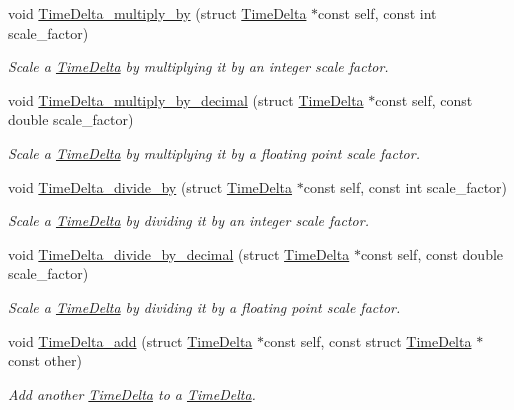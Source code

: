 \begin{DoxyCompactItemize}
void \hyperlink{time-delta_8h_a772db85da3c67f149da8877ac8d04fad}{\-Time\-Delta\-\_\-multiply\-\_\-by} (struct \hyperlink{structTimeDelta}{\-Time\-Delta} $\ast$const self, const int scale\-\_\-factor)
\begin{DoxyCompactList}\small\item\em \-Scale a \hyperlink{structTimeDelta}{\-Time\-Delta} by multiplying it by an integer scale factor. \end{DoxyCompactList}\item 
void \hyperlink{time-delta_8h_a561fba60f8ba4648928fec8e18069ebb}{\-Time\-Delta\-\_\-multiply\-\_\-by\-\_\-decimal} (struct \hyperlink{structTimeDelta}{\-Time\-Delta} $\ast$const self, const double scale\-\_\-factor)
\begin{DoxyCompactList}\small\item\em \-Scale a \hyperlink{structTimeDelta}{\-Time\-Delta} by multiplying it by a floating point scale factor. \end{DoxyCompactList}\item 
void \hyperlink{time-delta_8h_abab39f5630f78511f708765da0be8632}{\-Time\-Delta\-\_\-divide\-\_\-by} (struct \hyperlink{structTimeDelta}{\-Time\-Delta} $\ast$const self, const int scale\-\_\-factor)
\begin{DoxyCompactList}\small\item\em \-Scale a \hyperlink{structTimeDelta}{\-Time\-Delta} by dividing it by an integer scale factor. \end{DoxyCompactList}\item 
void \hyperlink{time-delta_8h_acca21ee20d4addbd3925461259f4f12a}{\-Time\-Delta\-\_\-divide\-\_\-by\-\_\-decimal} (struct \hyperlink{structTimeDelta}{\-Time\-Delta} $\ast$const self, const double scale\-\_\-factor)
\begin{DoxyCompactList}\small\item\em \-Scale a \hyperlink{structTimeDelta}{\-Time\-Delta} by dividing it by a floating point scale factor. \end{DoxyCompactList}\item 
void \hyperlink{time-delta_8h_a388c9982a85d4f02741d4905fc8c3a1b}{\-Time\-Delta\-\_\-add} (struct \hyperlink{structTimeDelta}{\-Time\-Delta} $\ast$const self, const struct \hyperlink{structTimeDelta}{\-Time\-Delta} $\ast$const other)
\begin{DoxyCompactList}\small\item\em \-Add another \hyperlink{structTimeDelta}{\-Time\-Delta} to a \hyperlink{structTimeDelta}{\-Time\-Delta}. \end{DoxyCompactList}\item 

\end{DoxyCompactItemize}
